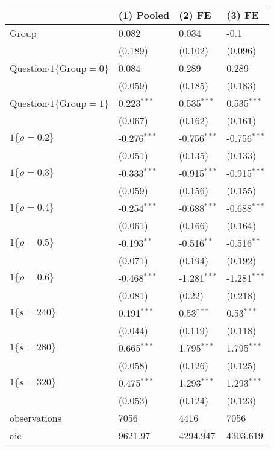 \begin{tabular}{llll}
\hline
 & (1) Pooled & (2) FE & (3) FE \\
\hline
Group & 0.082 & 0.034 & -0.1 \\
 & (0.189) & (0.102) & (0.096) \\
Question$\cdot1\{\text{Group}=0\}$ & 0.084 & 0.289 & 0.289 \\
 & (0.059) & (0.185) & (0.183) \\
Question$\cdot1\{\text{Group}=1\}$ & 0.223$^{***}$ & 0.535$^{***}$ & 0.535$^{***}$ \\
 & (0.067) & (0.162) & (0.161) \\
$1\{\rho=0.2\}$ & -0.276$^{***}$ & -0.756$^{***}$ & -0.756$^{***}$ \\
 & (0.051) & (0.135) & (0.133) \\
$1\{\rho=0.3\}$ & -0.333$^{***}$ & -0.915$^{***}$ & -0.915$^{***}$ \\
 & (0.059) & (0.156) & (0.155) \\
$1\{\rho=0.4\}$ & -0.254$^{***}$ & -0.688$^{***}$ & -0.688$^{***}$ \\
 & (0.061) & (0.166) & (0.164) \\
$1\{\rho=0.5\}$ & -0.193$^{**}$ & -0.516$^{**}$ & -0.516$^{**}$ \\
 & (0.071) & (0.194) & (0.192) \\
$1\{\rho=0.6\}$ & -0.468$^{***}$ & -1.281$^{***}$ & -1.281$^{***}$ \\
 & (0.081) & (0.22) & (0.218) \\
$1\{s=240\}$ & 0.191$^{***}$ & 0.53$^{***}$ & 0.53$^{***}$ \\
 & (0.044) & (0.119) & (0.118) \\
$1\{s=280\}$ & 0.665$^{***}$ & 1.795$^{***}$ & 1.795$^{***}$ \\
 & (0.058) & (0.126) & (0.125) \\
$1\{s=320\}$ & 0.475$^{***}$ & 1.293$^{***}$ & 1.293$^{***}$ \\
 & (0.053) & (0.124) & (0.123) \\\hline

observations & 7056 & 4416 & 7056 \\
aic & 9621.97 & 4294.947 & 4303.619 \\
\hline
\end{tabular}
